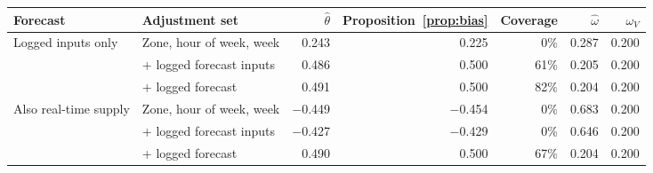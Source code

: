 \begin{tabular}{llrrrrr}
\toprule
Forecast & Adjustment set & $\hat\theta$ & Proposition~\ref{prop:bias} & Coverage & $\hat\omega$ & $\omega_V$ \\
\midrule
Logged inputs only & Zone, hour of week, week & 0.243 & 0.225 & 0\% & 0.287 & 0.200 \\
 & + logged forecast inputs & 0.486 & 0.500 & 61\% & 0.205 & 0.200 \\
 & + logged forecast & 0.491 & 0.500 & 82\% & 0.204 & 0.200 \\
\addlinespace
Also real-time supply & Zone, hour of week, week & $-$0.449 & $-$0.454 & 0\% & 0.683 & 0.200 \\
 & + logged forecast inputs & $-$0.427 & $-$0.429 & 0\% & 0.646 & 0.200 \\
 & + logged forecast & 0.490 & 0.500 & 67\% & 0.204 & 0.200 \\
\bottomrule
\end{tabular}
